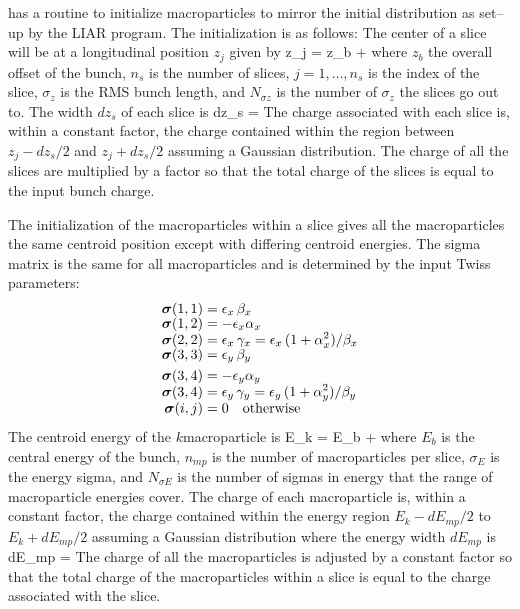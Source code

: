 \bmad has a routine to initialize macroparticles to mirror the initial
distribution as set--up by the LIAR program\cite{b:liar}. The
initialization is as follows: The center of a
slice will be at a longitudinal position $z_j$ given by
\Begineq
  z_j = z_b + 
\Endeq
where $z_b$ the overall offset of the bunch, 
$n_s$ is the number of slices, $j = 1, \ldots,
n_s$ is the index of the slice, $\sigma_z$ is the RMS bunch length,
and $N_{\sigma z}$ is the number of $\sigma_z$ the slices go out
to. The width $dz_s$ of each slice is
\Begineq
    dz_s = 
\Endeq
The charge associated with each slice is, within a constant factor,
the charge contained within the region between $z_j - dz_s/2$ and $z_j
+ dz_s/2$ assuming a Gaussian distribution.  The charge of all the
slices are multiplied by a factor so that the total charge of the
slices is equal to the input bunch charge.

The initialization of the macroparticles within a slice gives all the
macroparticles the same centroid position except with differing
centroid energies. 
The sigma matrix is the same for all macroparticles and is
determined by the input Twiss parameters:
\begin{align}
  \bfsig(1,1) &= \epsilon_x \, \beta_x \CRNEG
  \bfsig(1,2) &= -\epsilon_x \alpha_x  \CRNEG
  \bfsig(2,2) &= \epsilon_x \, \gamma_x = 
      \epsilon_x \, (1 + \alpha_x^2) / \beta_x \CRNEG
  \bfsig(3,3) &= \epsilon_y \, \beta_y \\
  \bfsig(3,4) &= -\epsilon_y \alpha_y \CRNEG
  \bfsig(3,4) &= \epsilon_y \, \gamma_y = 
      \epsilon_y \, (1 + \alpha_y^2) / \beta_y \CRNEG
  \bfsig(i,j) &= 0 \quad \mbox{otherwise} \nonumber
\end{align}
The centroid energy of the $k$\Th macroparticle is
\Begineq
  E_k = E_b + 
\Endeq
where $E_b$ is the central energy of the bunch, $n_{mp}$ is the number
of macroparticles per slice, $\sigma_E$ is the energy sigma, and
$N_{\sigma E}$ is the number of sigmas in energy that the range of
macroparticle energies cover. The charge of each macroparticle is,
within a constant factor, the charge contained within the energy
region $E_k - dE_{mp}/2$ to $E_k + dE_{mp}/2$ assuming a Gaussian
distribution where the energy width $dE_{mp}$ is
\Begineq
  dE_{mp} = 
\Endeq
The charge of all the macroparticles is adjusted by a constant factor
so that the total charge of the macroparticles within a slice is equal
to the charge associated with the slice.

